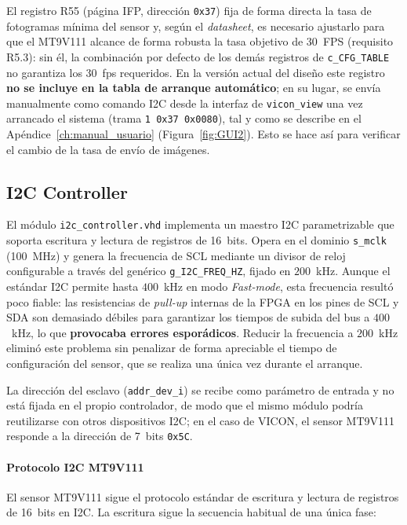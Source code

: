 \documentclass[../main.tex]{subfiles}
\begin{document}
El registro R55 (página \ac{IFP}, dirección \texttt{0x37}) fija de forma directa la tasa de fotogramas mínima del sensor y, según el \textit{datasheet}, es necesario ajustarlo para que el MT9V111 alcance de forma robusta la tasa objetivo de 30~\ac{FPS} (requisito R5.3): sin él, la combinación por defecto de los demás registros de \texttt{c\_CFG\_TABLE} no garantiza los 30~fps requeridos. En la versión actual del diseño este registro \textbf{no se incluye en la tabla de arranque automático}; en su lugar, se envía manualmente como comando I2C desde la interfaz de \texttt{vicon\_view} una vez arrancado el sistema (trama \texttt{1 0x37 0x0080}), tal y como se describe en el Apéndice~\ref{ch:manual_usuario} (Figura~\ref{fig:GUI2}). Esto se hace así para verificar el cambio de la tasa de envío de imágenes.
\subsection{I2C Controller}
\label{sec:i2c_controller}

El módulo \texttt{i2c\_controller.vhd} implementa un maestro \ac{I2C} parametrizable que soporta escritura y lectura de registros de 16~bits. Opera en el dominio \texttt{s\_mclk} (100~MHz) y genera la frecuencia de \ac{SCL} mediante un divisor de reloj configurable a través del genérico \texttt{g\_I2C\_FREQ\_HZ}, fijado en $200$~kHz. Aunque el estándar \ac{I2C} permite hasta $400$~kHz en modo \textit{Fast-mode}, esta frecuencia resultó poco fiable: las resistencias de \textit{pull-up} internas de la \ac{FPGA} en los pines de \ac{SCL} y \ac{SDA} son demasiado débiles para garantizar los tiempos de subida del bus a $400$~kHz, lo que \textbf{provocaba errores esporádicos}. Reducir la frecuencia a $200$~kHz eliminó este problema sin penalizar de forma apreciable el tiempo de configuración del sensor, que se realiza una única vez durante el arranque.

La dirección del esclavo (\texttt{addr\_dev\_i}) se recibe como parámetro de entrada y no está fijada en el propio controlador, de modo que el mismo módulo podría reutilizarse con otros dispositivos \ac{I2C}; en el caso de VICON, el sensor MT9V111 responde a la dirección de 7~bits \texttt{0x5C}.

\paragraph{Protocolo I2C MT9V111}

El sensor MT9V111 sigue el protocolo estándar de escritura y lectura de registros de 16~bits en \ac{I2C}. La escritura sigue la secuencia habitual de una única fase:
\end{document}

